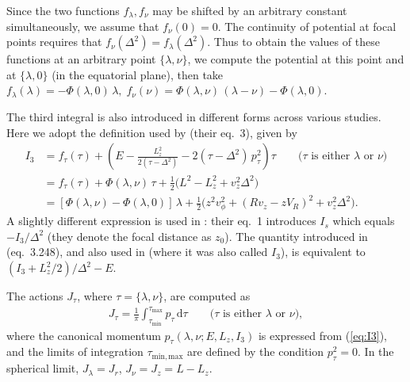 \documentclass[12pt]{article}
\renewcommand{\d}{\mathrm{d}}
\begin{document}
Since the two functions $f_\lambda,f_\nu$ may be shifted by an arbitrary constant simultaneously, we assume that $f_\nu(0)=0$. The continuity of potential at focal points requires that $f_\nu(\Delta^2)=f_\lambda(\Delta^2)$. Thus to obtain the values of these functions at an arbitrary point $\{\lambda,\nu\}$, we compute the potential at this point and at $\{\lambda,0\}$ (in the equatorial plane), then take $f_\lambda(\lambda) = -\Phi(\lambda,0)\,\lambda,\; f_\nu(\nu) = \Phi(\lambda,\nu)\,(\lambda-\nu) - \Phi(\lambda,0)$.

The third integral is also introduced in different forms across various studies.
Here we adopt the definition used by \cite{Sanders2012} (their eq.~3), given by
\begin{subequations}
\begin{align}
I_3 &= f_\tau(\tau) + \left( E - \frac{L_z^2}{2(\tau-\Delta^2)} - 2(\tau-\Delta^2)\,p_\tau^2 \right) \tau \qquad\mbox{($\tau$ is either $\lambda$ or $\nu$)}  \label{eq:I3} \\
&= f_\tau(\tau) + \Phi(\lambda,\nu)\,\tau +
\textstyle \frac12 \big( L^2 - L_z^2 + v_z^2\Delta^2 \big) \nonumber \\
&= [\Phi(\lambda,\nu) - \Phi(\lambda,0)]\,\lambda +
\textstyle \frac12 \big( z^2 v_\phi^2 + (R v_z - z V_R)^2 + v_z^2\Delta^2 \big) . \label{eq:I3init}
\end{align}
\end{subequations}
A slightly different expression is used in \cite{Bienayme2015}: their eq.~1 introduces $I_s$ which equals $-I_3/\Delta^2$ (they denote the focal distance as $z_0$). 
The quantity introduced in \cite{BinneyTremaine} (eq.~3.248), and also used in \cite{Binney2012} (where it was also called $I_3$), is equivalent to $(I_3 + L_z^2/2) / \Delta^2 - E$.

The actions $J_\tau$, where $\tau=\{\lambda,\nu\}$, are computed as
\begin{align}  \label{eq:ActionsStaeckel}
J_\tau = \frac{1}{\pi} \int_{\tau_\mathrm{min}}^{\tau_\mathrm{max}} p_\tau\,\d \tau
\qquad\mbox{($\tau$ is either $\lambda$ or $\nu$)},
\end{align}
where the canonical momentum $p_\tau(\lambda,\nu;E,L_z,I_3)$ is expressed from (\ref{eq:I3}), and the limits of integration $\tau_\mathrm{min,max}$ are defined by the condition $p_\tau^2=0$. In the spherical limit, $J_\lambda = J_r$, $J_\nu = J_z = L-L_z$.
\end{document}

